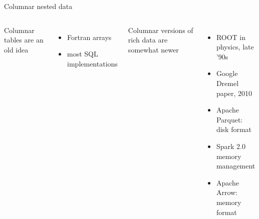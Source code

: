 \documentclass{beamer}
\begin{document}
\begin{frame}{Columnar nested data}
\vspace{0.5 cm}

\begin{columns}
Columnar tables are an old idea
\begin{itemize}
\item Fortran arrays
\item most SQL implementations
\end{itemize}

\vspace{0.5 cm}
Columnar versions of rich data are somewhat newer
\begin{itemize}
\item ROOT in physics, late '90s
\item Google Dremel paper, 2010
\item Apache Parquet: disk format
\item Spark 2.0 memory management
\item Apache Arrow: memory format
\end{itemize}


\end{columns}
\end{frame}
\end{document}
